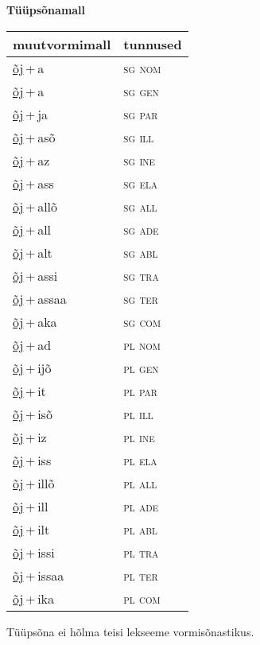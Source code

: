 
\vspace{1.8em}
\begin{minipage}{\textwidth}
\textbf{Tüüpsõnamall \,}\\

\begin{sideways}
\begin{tabular}{l l}
muutvormimall & tunnused \\
\hline
\underline{õj}\,+\,a & \textsc{ sg nom } \\
\underline{õj}\,+\,a & \textsc{ sg gen } \\
\underline{õj}\,+\,ja & \textsc{ sg par } \\
\underline{õj}\,+\,asõ & \textsc{ sg ill } \\
\underline{õj}\,+\,az & \textsc{ sg ine } \\
\underline{õj}\,+\,ass & \textsc{ sg ela } \\
\underline{õj}\,+\,allõ & \textsc{ sg all } \\
\underline{õj}\,+\,all & \textsc{ sg ade } \\
\underline{õj}\,+\,alt & \textsc{ sg abl } \\
\underline{õj}\,+\,assi & \textsc{ sg tra } \\
\underline{õj}\,+\,assaa & \textsc{ sg ter } \\
\underline{õj}\,+\,aka & \textsc{ sg com } \\
\underline{õj}\,+\,ad & \textsc{ pl nom } \\
\underline{õj}\,+\,ijõ & \textsc{ pl gen } \\
\underline{õj}\,+\,it & \textsc{ pl par } \\
\underline{õj}\,+\,isõ & \textsc{ pl ill } \\
\underline{õj}\,+\,iz & \textsc{ pl ine } \\
\underline{õj}\,+\,iss & \textsc{ pl ela } \\
\underline{õj}\,+\,illõ & \textsc{ pl all } \\
\underline{õj}\,+\,ill & \textsc{ pl ade } \\
\underline{õj}\,+\,ilt & \textsc{ pl abl } \\
\underline{õj}\,+\,issi & \textsc{ pl tra } \\
\underline{õj}\,+\,issaa & \textsc{ pl ter } \\
\underline{õj}\,+\,ika & \textsc{ pl com } \\
\end{tabular}
\end{sideways}
\label{tab:tüüpsõnamall-õja}

\end{minipage}

 
\vspace{1em}
\noindent Tüüpsõna ei hõlma teisi lekseeme vormi\-sõnastikus.
